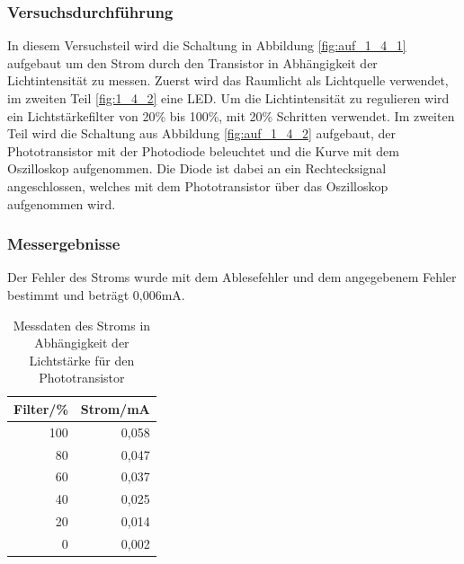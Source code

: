 \documentclass[12pt,a4paper]{article}
\begin{document}
\subsubsection*{Versuchsdurchführung}

In diesem Versuchsteil wird die Schaltung in Abbildung \ref{fig:auf_1_4_1} aufgebaut um den Strom durch den Transistor in Abhängigkeit der Lichtintensität zu messen. Zuerst wird das Raumlicht als Lichtquelle verwendet, im zweiten Teil \ref{fig:1_4_2} eine LED. Um die Lichtintensität zu regulieren wird ein Lichtstärkefilter von 20\% bis 100\%, mit 20\% Schritten verwendet. Im zweiten Teil wird die Schaltung aus Abbildung \ref{fig:auf_1_4_2} aufgebaut, der Phototransistor mit der Photodiode beleuchtet und die Kurve mit dem Oszilloskop aufgenommen. Die Diode ist dabei an ein Rechtecksignal angeschlossen, welches mit dem Phototransistor über das Oszilloskop aufgenommen wird.

\subsubsection*{Messergebnisse}

Der Fehler des Stroms wurde mit dem Ablesefehler und dem angegebenem Fehler bestimmt und beträgt 0,006mA.

\begin{table}[H]
\begin{center}
\begin{tabular}{|r|r|}
\hline
\multicolumn{1}{|l|}{Filter/\%} & \multicolumn{1}{l|}{Strom/mA} \\ \hline
100 & 0,058 \\ \hline
80 & 0,047 \\ \hline
60 & 0,037 \\ \hline
40 & 0,025 \\ \hline
20 & 0,014 \\ \hline
0 & 0,002 \\ \hline
\end{tabular}
\end{center}
\caption{Messdaten des Stroms in Abhängigkeit der Lichtstärke für den Phototransistor}
\label{tab:1_4_transistor}
\end{table}
\end{document}
